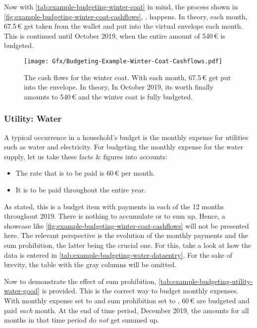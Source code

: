 Now with \autoref{tab:example-budgeting-winter-coat} in mind, the process shown in \autoref{fig:example-budgeting-winter-coat-cashflows}, , happens.
In theory, each month, 67.5\,€ get taken from the wallet and put into the virtual envelope each month.
This is continued until October 2019, when the entire amount of 540\,€ is budgeted.

\begin{figure}[hbtp]
	\centering
	\texttt{[image: Gfx/Budgeting-Example-Winter-Coat-Cashflows.pdf]}
	\caption[Cash Flows for the Winter Coat]{The cash flows for the winter coat.
	With each month, 67.5\,€ get put into the envelope.
	In theory, 
	In October 2019, its worth finally amounts to 540\,€ and the winter coat is fully budgeted.}
\label{fig:example-budgeting-winter-coat-cashflows}
\end{figure}

\subsubsection{Utility: Water}
\label{subsubsec:example-budgeting-utility-water}

A typical occurrence in a household's budget is the monthly expense for utilities such as water and electricity.
For budgeting the monthly expense for the water supply, let us take these facts \& figures into accounts:
\begin{itemize}
	\item The rate that is to be paid is 60\,€ per month.
	\item It is to be paid throughout the entire year.
\end{itemize}

As stated, this is a budget item with payments in each of the 12 months throughout 2019.
There is nothing to accumulate or to sum up.
Hence, a showcase like \autoref{fig:example-budgeting-winter-coat-cashflows} will not be presented here.
The relevant perspective is the evolution of the monthly payments and the sum prohibition, the latter being the crucial one.
For this, take a look at how the data is entered in \autoref{tab:example-budgeting-water-dataentry}.
For the sake of brevity, the table with the gray columns will be omitted.

Now to demonstrate the effect of sum prohibition, \autoref{tab:example-budgeting-utility-water-good} is provided.
This is the correct way to budget monthly expenses.
With monthly expense set to  and sum prohibition set to , 60\,€ are budgeted and paid \emph{each} month.
At the end of time period, \ie December 2019, the amounts for all months in that time period do \emph{not} get summed up.

